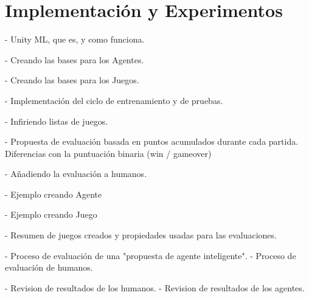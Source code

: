 \chapter{Implementación y Experimentos}\label{chapter:implementation}

- Unity ML, que es, y como funciona.

- Creando las bases para los Agentes.

- Creando las bases para los Juegos.


- Implementación del ciclo de entrenamiento y de pruebas.

- Infiriendo listas de juegos.

- Propuesta de evaluación basada en puntos acumulados durante cada partida. Diferencias con la puntuación binaria (win / gameover)

- Añadiendo la evaluación a humanos.

- Ejemplo creando Agente 

- Ejemplo creando Juego

- Resumen de juegos creados y propiedades usadas para las evaluaciones.

- Proceso de evaluación de una "propuesta de agente inteligente".
- Proceso de evaluación de humanos.
 
- Revision de resultados de los humanos.
- Revision de resultados de los agentes.
